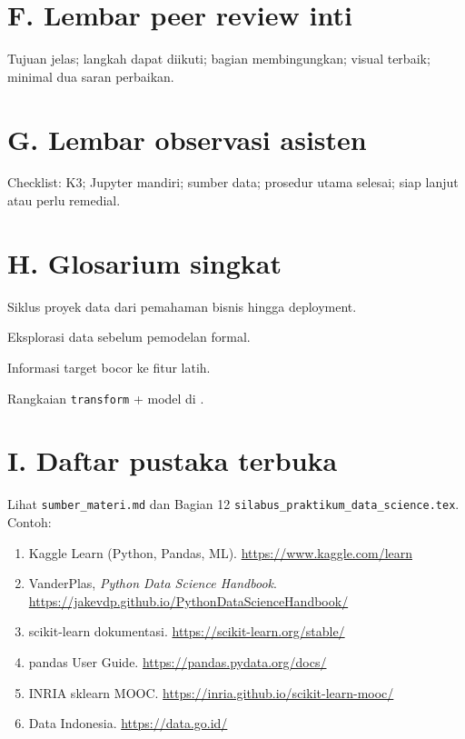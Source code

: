\section*{F. Lembar peer review inti}

Tujuan jelas; langkah dapat diikuti; bagian membingungkan; visual terbaik; minimal dua saran perbaikan.

\section*{G. Lembar observasi asisten}

Checklist: K3; Jupyter mandiri; sumber data; prosedur utama selesai; siap lanjut atau perlu remedial.

\section*{H. Glosarium singkat}

\begin{description}[style=nextline, widest=Pipeline:, itemsep=0.2em]
  \item[CRISP-DM:] Siklus proyek data dari pemahaman bisnis hingga deployment.
  \item[EDA:] Eksplorasi data sebelum pemodelan formal.
  \item[Leakage:] Informasi target bocor ke fitur latih.
  \item[Pipeline:] Rangkaian \texttt{transform} + model di \sklearn{}.
\end{description}

\section*{I. Daftar pustaka terbuka}

Lihat \texttt{sumber\_materi.md} dan Bagian 12 \texttt{silabus\_praktikum\_data\_science.tex}. Contoh:

\begin{enumerate}[leftmargin=*]
  \item Kaggle Learn (Python, Pandas, ML). \url{https://www.kaggle.com/learn}
  \item VanderPlas, \textit{Python Data Science Handbook}. \url{https://jakevdp.github.io/PythonDataScienceHandbook/}
  \item scikit-learn dokumentasi. \url{https://scikit-learn.org/stable/}
  \item pandas User Guide. \url{https://pandas.pydata.org/docs/}
  \item INRIA sklearn MOOC. \url{https://inria.github.io/scikit-learn-mooc/}
  \item Data Indonesia. \url{https://data.go.id/}
\end{enumerate}

